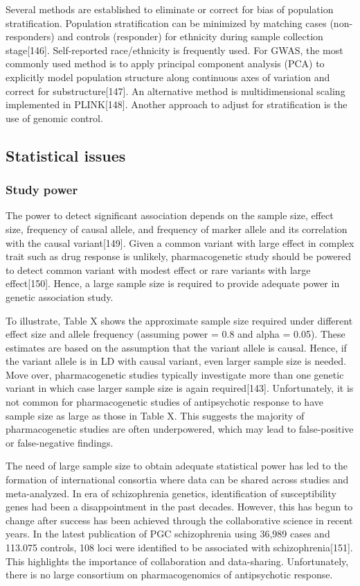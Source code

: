 \documentclass[12pt]{report}
\begin{document}
				Several methods are established to eliminate or correct for bias of population stratification.
				Population stratification can be minimized by matching cases (non-responders) and controls (responder) for ethnicity during sample collection stage[146]. 
				Self-reported race/ethnicity is frequently used. 
				For GWAS, the most commonly used method is to apply principal component analysis (PCA) to explicitly model population structure along continuous axes of variation and correct for substructure[147]. 
				An alternative method is multidimensional scaling implemented in PLINK[148]. 
				Another approach to adjust for stratification is the use of genomic control. 
			\subsection{Statistical issues}
			\subsubsection{Study power}
				The power to detect significant association depends on the sample size, effect size, frequency of causal allele, and frequency of marker allele and its correlation with the causal variant[149]. 
				Given a common variant with large effect in complex trait such as drug response is unlikely, pharmacogenetic study should be powered to detect common variant with modest effect or rare variants with large effect[150]. 
				Hence, a large sample size is required to provide adequate power in genetic association study.
				 
				To illustrate, Table X shows the approximate sample size required under different effect size and allele frequency (assuming power = 0.8 and alpha = 0.05). 
				These estimates are based on the assumption that the variant allele is causal. 
				Hence, if the variant allele is in LD with causal variant, even larger sample size is needed. 
				Move over, pharmacogenetic studies typically investigate more than one genetic variant in which case larger sample size is again required[143]. 
				Unfortunately, it is not common for pharmacogenetic studies of antipsychotic response to have sample size as large as those in Table X. 
				This suggests the majority of pharmacogenetic studies are often underpowered, which may lead to false-positive or false-negative findings. 
				
				The need of large sample size to obtain adequate statistical power has led to the formation of international consortia where data can be shared across studies and meta-analyzed. 
				In era of schizophrenia genetics, identification of susceptibility genes had been a disappointment in the past decades. 
				However, this has begun to change after success has been achieved through the collaborative science in recent years. 
				In the latest publication of PGC schizophrenia using 36,989 cases and 113.075 controls, 108 loci were identified to be associated with schizophrenia[151]. 
				This highlights the importance of collaboration and data-sharing. 
				Unfortunately, there is no large consortium on pharmacogenomics of antipsychotic response. 
\end{document}
